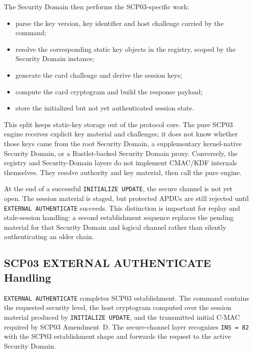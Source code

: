 The Security Domain then performs the SCP03-specific work:
\begin{itemize}
\item parse the key version, key identifier and host challenge carried by the
  command;
\item resolve the corresponding static key objects in the registry, scoped by
  the Security Domain instance;
\item generate the card challenge and derive the session keys;
\item compute the card cryptogram and build the response payload;
\item store the initialized but not yet authenticated session state.
\end{itemize}

This split keeps static-key storage out of the protocol core. The pure SCP03
engine receives explicit key material and challenges; it does not know whether
those keys came from the root Security Domain, a supplementary kernel-native
Security Domain, or a Rustlet-backed Security Domain proxy. Conversely, the
registry and Security-Domain layers do not implement CMAC/KDF internals
themselves. They resolve authority and key material, then call the pure engine.

At the end of a successful \texttt{INITIALIZE UPDATE}, the secure channel is
not yet open. The session material is staged, but protected APDUs are still
rejected until \texttt{EXTERNAL AUTHENTICATE} succeeds. This distinction is
important for replay and stale-session handling: a second establishment
sequence replaces the pending material for that Security Domain and logical
channel rather than silently authenticating an older chain.

\subsection{SCP03 EXTERNAL AUTHENTICATE Handling}
\label{sec:impl-scp-auth}

\texttt{EXTERNAL AUTHENTICATE} completes SCP03 establishment. The command
contains the requested security level, the host cryptogram computed over the
session material produced by \texttt{INITIALIZE UPDATE}, and the transmitted
initial C-MAC required by SCP03 Amendment~D. The secure-channel layer recognizes
\texttt{INS = 82} with the SCP03 establishment shape and forwards the request
to the active Security Domain.

